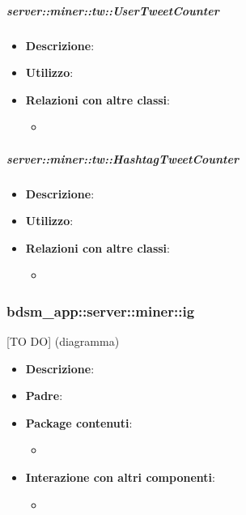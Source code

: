	\subparagraph{server::miner::tw::UserTweetCounter} %
		\label{subp:server_miner_tw_UserTweetCounter}
			\begin{itemize}
				\item \textbf{Descrizione}:
				\item \textbf{Utilizzo}: 
				\item \textbf{Relazioni con altre classi}:
					\begin{itemize}
						\item 
					\end{itemize}
			\end{itemize}
		
		
	\subparagraph{server::miner::tw::HashtagTweetCounter} %
		\label{subp:server_miner_tw_HashtagTweetCounter}
			\begin{itemize}
				\item \textbf{Descrizione}:
				\item \textbf{Utilizzo}: 
				\item \textbf{Relazioni con altre classi}:
					\begin{itemize}
						\item 
					\end{itemize}
			\end{itemize}

\subsubsection{bdsm\_app::server::miner::ig} %
\label{ssub:bdsm_app_server_miner_ig}
[TO DO] (diagramma) \newline \newline

\begin{itemize}
  \item \textbf{Descrizione}:
  \item \textbf{Padre}:
  \item \textbf{Package contenuti}:
  	\begin{itemize}
  		\item
  	\end{itemize}
  \item \textbf{Interazione con altri componenti}:
  	\begin{itemize}
  		\item  	
  	\end{itemize}
\end{itemize}	

